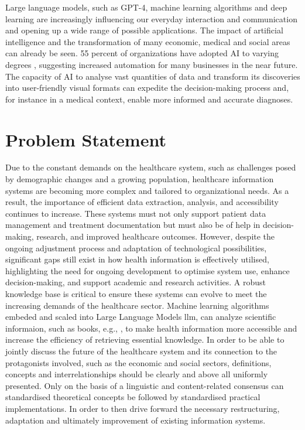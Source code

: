 Large language models, such as GPT-4, machine learning algorithms and deep learning are increasingly influencing our everyday interaction and communication and opening up a wide range of possible applications. 
The impact of artificial intelligence and the transformation of many economic, medical and social areas can already be seen. 
55 percent of organizations have adopted AI to varying degrees \citep{mckinsey_ai_2023}, suggesting increased automation for many businesses in the near future. 
The capacity of AI to analyse vast quantities of data and transform its discoveries into user-friendly visual formats can expedite the decision-making process and, for instance in a medical context,  enable more informed and accurate diagnoses.\citep{esteva_skin_cancer}
\section{Problem Statement}
Due to the constant demands on the healthcare system, such as challenges posed by demographic changes and a growing population, healthcare information systems are becoming more complex and tailored to organizational needs. 
As a result, the importance of efficient data extraction, analysis, and accessibility continues to increase. 
These systems must not only support patient data management and treatment documentation but must also be of help in decision-making, research, and improved healthcare outcomes. 
However, despite the ongoing adjustment process and adaptation of technological possibilities, significant gaps still exist in how health information is effectively utilised, highlighting the need for ongoing development to optimise system use, enhance decision-making, and support academic and research activities. 
A robust knowledge base is critical to ensure these systems can evolve to meet the increasing demands of the healthcare sector.
Machine learning algorithms embeded and scaled into Large Language Models \ac{llm}, can analyze scientific informaion, such as books, e.g., \citet{bb2}, to make health information more accessible and increase the efficiency of retrieving essential knowledge. 
In order to be able to jointly discuss the future of the healthcare system and its connection to the protagonists involved, such as the economic and social sectors, definitions, concepts and interrelationships should be clearly and above all uniformly presented. 
Only on the basis of a linguistic and content-related consensus can standardised theoretical concepts be followed by standardised practical implementations. 
In order to then drive forward the necessary restructuring, adaptation and ultimately improvement of existing information systems. 
